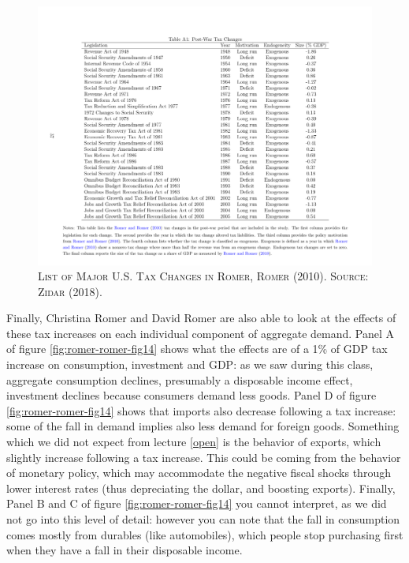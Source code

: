 \documentclass[]{book}
\begin{document}
\begin{figure}

{\centering \includegraphics[width=0.8\linewidth,height=0.8\textheight]{figures/Zidar2017/tabA1} 

}

\caption{\textsc{List of Major U.S. Tax Changes in
Romer, Romer (2010). Source: Zidar (2018).}}\label{fig:romer-romer-shocks}
\end{figure}

Finally, Christina Romer and David Romer are also able to look at the
effects of these tax increases on each individual component of aggregate
demand. Panel A of figure \ref{fig:romer-romer-fig14} shows what the
effects are of a 1\% of GDP tax increase on consumption, investment and
GDP: as we saw during this class, aggregate consumption declines,
presumably a disposable income effect, investment declines because
consumers demand less goods. Panel D of figure
\ref{fig:romer-romer-fig14} shows that imports also decrease following a
tax increase: some of the fall in demand implies also less demand for
foreign goods. Something which we did not expect from lecture \ref{open}
is the behavior of exports, which slightly increase following a tax
increase. This could be coming from the behavior of monetary policy,
which may accommodate the negative fiscal shocks through lower interest
rates (thus depreciating the dollar, and boosting exports). Finally,
Panel B and C of figure \ref{fig:romer-romer-fig14} you cannot
interpret, as we did not go into this level of detail: however you can
note that the fall in consumption comes mostly from durables (like
automobiles), which people stop purchasing first when they have a fall
in their disposable income.
\end{document}
